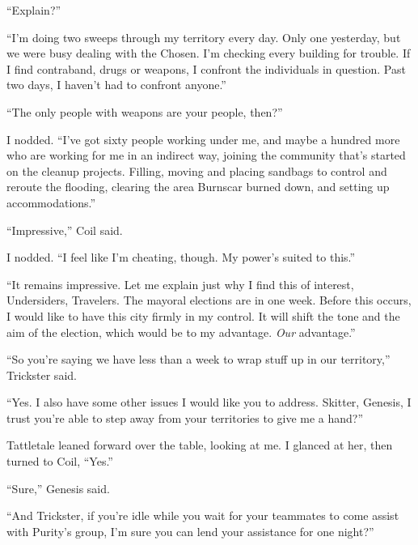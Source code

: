 ``Explain?''



``I'm doing two sweeps through my territory every day.  Only one yesterday, but we were busy dealing with the Chosen.  I'm checking every building for trouble.  If I find contraband, drugs or weapons, I confront the individuals in question.  Past two days, I haven't had to confront anyone.''



``The only people with weapons are your people, then?''



I nodded.  ``I've got sixty people working under me, and maybe a hundred more who are working for me in an indirect way, joining the community that's started on the cleanup projects.  Filling, moving and placing sandbags to control and reroute the flooding, clearing the area Burnscar burned down, and setting up accommodations.''



``Impressive,'' Coil said.



I nodded.  ``I feel like I'm cheating, though.  My power's suited to this.''



``It remains impressive.  Let me explain just why I find this of interest, Undersiders, Travelers.  The mayoral elections are in one week.  Before this occurs, I would like to have this city firmly in my control.  It will shift the tone and the aim of the election, which would be to my advantage.  \emph{Our} advantage.''



``So you're saying we have less than a week to wrap stuff up in our territory,'' Trickster said.



``Yes.  I also have some other issues I would like you to address.  Skitter, Genesis, I trust you're able to step away from your territories to give me a hand?''



Tattletale leaned forward over the table, looking at me.  I glanced at her, then turned to Coil, ``Yes.''



``Sure,'' Genesis said.



``And Trickster, if you're idle while you wait for your teammates to come assist with Purity's group, I'm sure you can lend your assistance for one night?''



